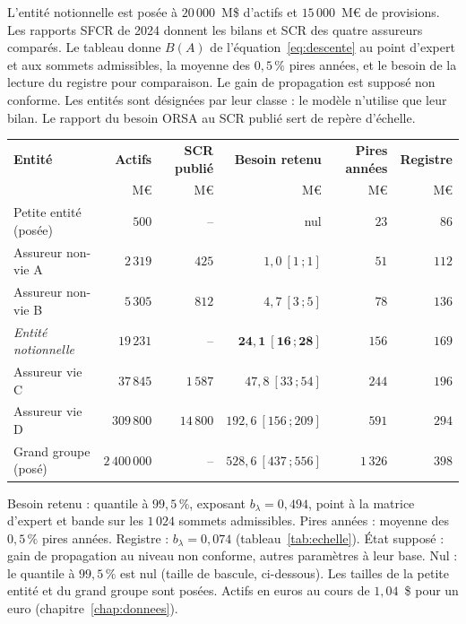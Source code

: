L'entité notionnelle est posée à $20\,000$~M\$ d'actifs et $15\,000$~M\euro{} de provisions.
Les rapports SFCR de 2024 donnent les bilans et SCR des quatre assureurs comparés.
Le tableau donne $B(A)$ de l'équation~\eqref{eq:descente} au point d'expert et aux sommets
admissibles, la moyenne des $0{,}5\,\%$ pires années, et le besoin de la lecture du registre pour
comparaison. Le gain de propagation est supposé non conforme.
Les entités sont désignées par leur classe : le modèle n'utilise que leur bilan. Le rapport du
besoin ORSA au SCR publié sert de repère d'échelle.

\noindent\begin{minipage}{\textwidth}
\begin{center}\small
\renewcommand{\arraystretch}{1.08}
\begin{tabular}{@{}l r r r r r@{}}
\toprule
\textbf{Entité} & \textbf{Actifs} & \textbf{SCR publié} & \textbf{Besoin retenu} &
\textbf{Pires années} & \textbf{Registre} \\
 & M\euro & M\euro & M\euro & M\euro & M\euro \\
\midrule
Petite entité (posée) & $500$ & -- & nul & $23$ & $86$ \\
Assureur non-vie A & $2\,319$ & $425$ & $1{,}0\ [1\,;1]$ & $51$ & $112$ \\
Assureur non-vie B & $5\,305$ & $812$ & $4{,}7\ [3\,;5]$ & $78$ & $136$ \\
\emph{Entité notionnelle} & $19\,231$ & -- & $\mathbf{24{,}1\ [16\,;28]}$ & $156$ & $169$ \\
Assureur vie C & $37\,845$ & $1\,587$ & $47{,}8\ [33\,;54]$ & $244$ & $196$ \\
Assureur vie D & $309\,800$ & $14\,800$ & $192{,}6\ [156\,;209]$ & $591$ & $294$ \\
Grand groupe (posé) & $2\,400\,000$ & -- & $528{,}6\ [437\,;556]$ & $1\,326$ & $398$ \\
\bottomrule
\end{tabular}
\end{center}
\noindent\parbox{\textwidth}{\footnotesize Besoin retenu : quantile à $99{,}5\,\%$, exposant $b_\lambda=0{,}494$,
point à la matrice d'expert et bande sur les $1\,024$ sommets admissibles. Pires années : moyenne des
$0{,}5\,\%$ pires années. Registre : $b_\lambda = 0{,}074$ (tableau~\ref{tab:echelle}). État supposé : gain de
propagation au niveau non conforme, autres paramètres à leur base. Nul : le quantile à $99{,}5\,\%$ est nul
(taille de bascule, ci-dessous). Les tailles de la petite entité et du grand groupe sont posées. Actifs en euros au cours de $1{,}04$~\$ pour un euro (chapitre~\ref{chap:donnees}).}
\end{minipage}

